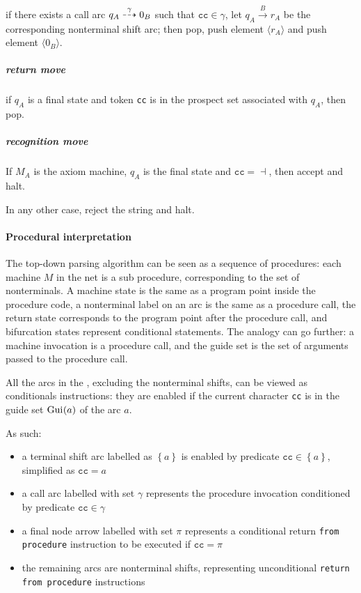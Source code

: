 \documentclass[english]{article}
\begin{document}
if there exists a call arc \(q_A \stackrel{\gamma}{\dashrightarrow} 0_B\) such that \(\texttt{cc} \in \gamma\), let \(q_A \xrightarrow{B} r_A\) be the corresponding nonterminal shift arc;
then pop, push element \(\langle r_A \rangle\) and push element \(\langle 0_B \rangle\).

\subparagraph*{return move}

if \(q_A\) is a final state and token \texttt{cc} is in the prospect set associated with \(q_A\), then pop.

\subparagraph*{recognition move}

If \(M_A\) is the axiom machine, \(q_A\) is the final state and \(\texttt{cc} = \dashv\), then accept and halt.

In any other case, reject the string and halt.

\paragraph{Procedural interpretation}

The top-down parsing algorithm can be seen as a sequence of procedures:
each machine \(M\) in the net is a sub procedure, corresponding to the set of nonterminals.
A machine state is the same as a program point inside the procedure code, a nonterminal label on an arc is the same as a procedure call, the return state corresponds to the program point after the procedure call, and bifurcation states represent conditional statements.
The analogy can go further: a machine invocation is a procedure call, and the guide set is the set of arguments passed to the procedure call.

\bigskip
All the arcs in the \PCFG, excluding the nonterminal shifts, can be viewed as conditionals instructions:
they are enabled if the current character \texttt{cc} is in the guide set \(\text{Gui}\hspace{0.1ex}(a)\) of the arc \(a\).

As such:

\begin{itemize}
  \item a terminal shift arc labelled as \(\left\{ a \right\}\) is enabled by predicate \(\texttt{cc} \in \left\{ a \right\}\), simplified as \(\texttt{cc}=a\)
  \item a call arc labelled with set \(\gamma\) represents the procedure invocation conditioned by predicate \(\texttt{cc} \in \gamma\)
  \item a final node arrow labelled with set \(\pi\) represents a conditional return \texttt{from procedure} instruction to be executed if \(\texttt{cc}=\pi\)
  \item the remaining \PCFG arcs are nonterminal shifts, representing unconditional \texttt{return from procedure} instructions
\end{itemize}
\end{document}
